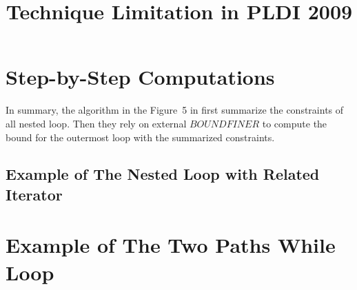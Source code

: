 \documentclass[a4paper,11pt]{article}
\begin{document}
\title{Technique Limitation in PLDI 2009}

\author{}

\date{}

\maketitle
%
% 
\section{Step-by-Step Computations}

In summary, the algorithm in the Figure~5 in \cite{GulwaniJK09} first summarize the constraints of all nested loop. 
Then they rely on external $BOUNDFINER$ to compute the bound for the outermost loop with the summarized constraints. 

\subsection{Example of The Nested Loop with Related Iterator}

\section{Example of The Two Paths While Loop}
% 

%


\clearpage


\end{document}
